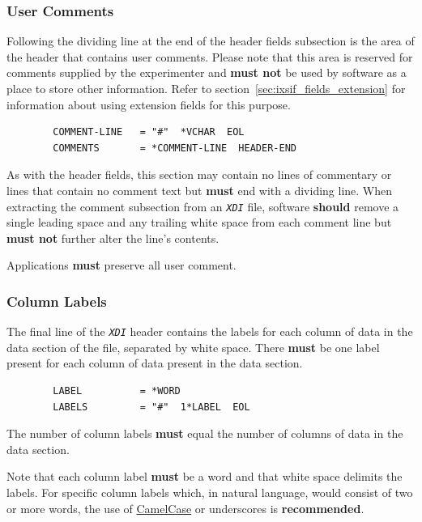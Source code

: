 \documentclass{article}
\newcommand{\sltt}[1]{\texttt{\textsl{#1}}}
\newcommand{\xdi}{\sltt{XDI}}
\begin{document}
\subsubsection{User Comments}
\label{sec:def_hdr_comments}

Following the dividing line at the end of the header fields subsection
is the area of the header that contains user comments. Please note
that this area is reserved for comments supplied by the experimenter
and \textbf{must not} be used by software as a place to store other
information.  Refer to section~\ref{sec:ixsif_fields_extension} for
information about using extension fields for this purpose.

\begin{verbatim}
        COMMENT-LINE   = "#"  *VCHAR  EOL
        COMMENTS       = *COMMENT-LINE  HEADER-END
\end{verbatim}

As with the header fields, this section may contain no lines of
commentary or lines that contain no comment text but \textbf{must} end
with a dividing line.  When extracting the comment subsection from an
{\xdi} file, software \textbf{should} remove a single leading space
and any trailing white space from each comment line but \textbf{must
  not} further alter the line's contents.

Applications \textbf{must} preserve all user comment.

\subsubsection{Column Labels}
\label{sec:def_hdr_labels}

The final line of the {\xdi} header contains the labels for each
column of data in the data section of the file, separated by
white space.  There \textbf{must} be one label present for each column
of data present in the data section.

\begin{verbatim}
        LABEL          = *WORD
        LABELS         = "#"  1*LABEL  EOL
\end{verbatim}

The number of column labels \textbf{must} equal the number of columns
of data in the data section.

Note that each column label \textbf{must} be a word and that white
space delimits the labels.  For specific column labels which, in
natural language, would consist of two or more words, the use of
\href{http://en.wikipedia.org/wiki/Camel_case}{CamelCase} or
underscores is \textbf{recommended}.
\end{document}
